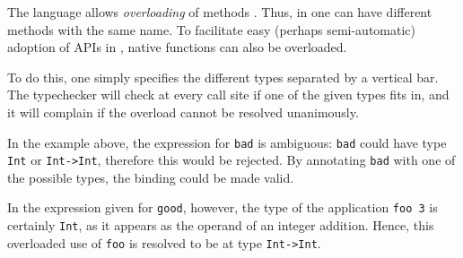 The \java{} language allows \emph{overloading} of methods \cite[section 8.4.9]{langspec3}. 
Thus, in \java{} one can have different methods with the same name. 
To facilitate easy (perhaps semi-automatic) adoption of \java{} APIs in \frege{}, native functions can also be overloaded.

\begin{flushleft}
     \sym{::} 
\end{flushleft}

To do this, one simply specifies the different types separated by a vertical bar.
The typechecker will check at every call site if one of the given types fits in, and it will complain if the overload cannot be resolved unanimously.


In the example above, the expression for \texttt{bad} is ambiguous: \texttt{bad} could have type \texttt{Int} or \texttt{Int->Int}, therefore this would be rejected. By annotating \texttt{bad} with one of the possible types, the binding could be made valid.

In the expression given for \texttt{good}, however, the type of the application \texttt{foo 3} is certainly \texttt{Int}, as it appears as the operand of an integer addition. Hence, this overloaded use of \texttt{foo} is resolved to be at type \texttt{Int->Int}.
